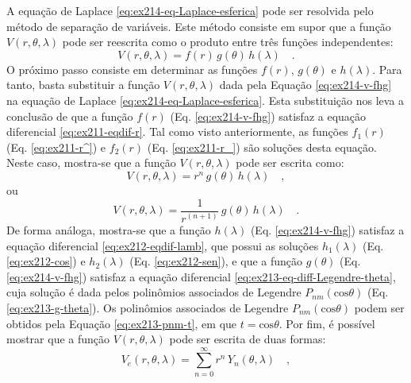 \documentclass[10pt,a4paper,fleqn]{article}
\begin{document}
A equa\c{c}ão de Laplace \ref{eq:ex214-eq-Laplace-esferica} pode ser resolvida pelo m\'{e}todo de separa\c{c}\~{a}o de vari\'{a}veis. 
Este m\'{e}todo consiste em supor que a fun\c{c}\~{a}o $V(r,\theta,\lambda)$ pode ser reescrita como o produto entre tr\^{e}s fun\c{c}\~{o}es 
independentes:
\begin{equation}
V(r,\theta,\lambda) = f(r) \, g(\theta) \, h(\lambda) \quad .
\label{eq:ex214-v-fhg}
\end{equation}
O pr\'{o}ximo passo consiste em determinar as fun\c{c}\~{o}es $f(r)$, $g(\theta)$ e $h(\lambda)$. Para tanto, basta substituir a fun\c{c}\~{a}o 
$V(r,\theta,\lambda)$ dada pela Equa\c{c}\~{a}o \ref{eq:ex214-v-fhg} na equa\c{c}\~{a}o de Laplace \ref{eq:ex214-eq-Laplace-esferica}. Esta 
substitui\c{c}\~{a}o nos leva a conclus\~{a}o de que a fun\c{c}\~{a}o $f(r)$ (Eq. \ref{eq:ex214-v-fhg}) satisfaz a equa\c{c}\~{a}o diferencial 
\ref{eq:ex211-eqdif-r}. Tal como visto anteriormente, as fun\c{c}\~{o}es $f_{1}(r)$ (Eq. \ref{eq:ex211-r^}) e $f_{2}(r)$ 
(Eq. \ref{eq:ex211-r_}) s\~{a}o solu\c{c}\~{o}es desta equa\c{c}\~{a}o. Neste caso, mostra-se que a fun\c{c}\~{a}o $V(r,\theta,\lambda)$ pode 
ser escrita como:
\begin{equation}
V(r,\theta,\lambda) = r^{n} \, g(\theta) \, h(\lambda) \quad ,
\label{eq:ex214-v-f1gh}
\end{equation}
ou
\begin{equation}
V(r,\theta,\lambda) = \frac{1}{r^{(n+1)}} \, g(\theta) \, h(\lambda) \quad .
\label{eq:ex214-v-f2gh}
\end{equation}
De forma an\'{a}loga, mostra-se que a fun\c{c}\~{a}o 
$h(\lambda)$ (Eq. \ref{eq:ex214-v-fhg}) satisfaz a equa\c{c}\~{a}o diferencial \ref{eq:ex212-eqdif-lamb}, que possui as solu\c{c}\~{o}es 
$h_{1}(\lambda)$ (Eq. \ref{eq:ex212-cos}) e $h_{2}(\lambda)$ (Eq. \ref{eq:ex212-sen}), e que a fun\c{c}\~{a}o $g(\theta)$ (Eq. 
\ref{eq:ex214-v-fhg}) satisfaz a equa\c{c}\~{a}o diferencial \ref{eq:ex213-eq-diff-Legendre-theta}, cuja solu\c{c}\~{a}o \'{e} dada 
pelos polin\^{o}mios associados de Legendre $P_{nm}(\text{cos}\theta)$ (Eq. \ref{eq:ex213-g-theta}). Os polin\^{o}mios associados de 
Legendre $P_{nm}(\text{cos}\theta)$ podem ser obtidos pela Equa\c{c}ão \ref{eq:ex213-pnm-t}, em que $t = \text{cos} \theta$. Por fim, \'{e} poss\'{i}vel 
mostrar que a fun\c{c}\~{a}o $V(r,\theta,\lambda)$ pode ser escrita de duas formas:
\begin{equation}
V_{e}(r,\theta,\lambda) = \sum_{n=0}^{\infty} r^{n} \, 
Y_{n}(\theta, \lambda) \quad ,
\label{eq:ex214-ve}
\end{equation}
\end{document}
